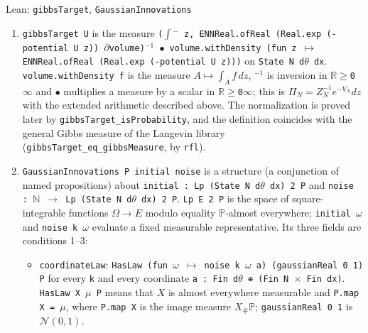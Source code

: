 \documentclass[11pt,a4paper]{report}
\begin{document}
\begin{leanbox}{Lean: \texttt{gibbsTarget}, \texttt{GaussianInnovations}}
\begin{enumerate}
\item \texttt{gibbs\allowbreak{}Target U} is the measure \texttt{(\ensuremath{\int}\ensuremath{{}^{-}} z, ENNReal.\allowbreak{}of\allowbreak{}Real (Real.\allowbreak{}exp (-\allowbreak{}potential U z)) \ensuremath{\partial}volume)\ensuremath{{}^{-1}} \ensuremath{\bullet} volume.\allowbreak{}with\allowbreak{}Density (fun z \ensuremath{\mapsto} ENNReal.\allowbreak{}of\allowbreak{}Real (Real.\allowbreak{}exp (-\allowbreak{}potential U z)))} on \texttt{State N d\ensuremath{\theta} dx}. \texttt{volume.\allowbreak{}with\allowbreak{}Density f} is the measure \(A\mapsto\int_Af\,dz\), \texttt{\ensuremath{{}^{-1}}} is inversion in \texttt{\ensuremath{\mathbb R}\ensuremath{\ge}0\ensuremath{\infty}} and \texttt{\ensuremath{\bullet}} multiplies a measure by a scalar in \texttt{\ensuremath{\mathbb R}\ensuremath{\ge}0\ensuremath{\infty}}; this is \(\Pi_N=Z_N^{-1}e^{-V_N}dz\) with the extended arithmetic described above. The normalization is proved later by \texttt{gibbs\allowbreak{}Target\_\allowbreak{}is\allowbreak{}Probability}, and the definition coincides with the general Gibbs measure of the Langevin library (\texttt{gibbs\allowbreak{}Target\_\allowbreak{}eq\_\allowbreak{}gibbs\allowbreak{}Measure}, by \texttt{rfl}).

\item \texttt{Gaussian\allowbreak{}Innovations P initial noise} is a structure (a conjunction of named propositions) about \texttt{initial : Lp (State N d\ensuremath{\theta} dx) 2 P} and \texttt{noise : \ensuremath{\mathbb N} \ensuremath{\to} Lp (State N d\ensuremath{\theta} dx) 2 P}. \texttt{Lp E 2 P} is the space of square-integrable functions \(\Omega\to E\) modulo equality \(\mathbb P\)-almost everywhere; \texttt{initial \ensuremath{\omega}} and \texttt{noise k \ensuremath{\omega}} evaluate a fixed measurable representative. Its three fields are conditions 1–3:

\begin{itemize}


\item \texttt{coordinate\allowbreak{}Law}: \texttt{Has\allowbreak{}Law (fun \ensuremath{\omega} \ensuremath{\mapsto} noise k \ensuremath{\omega} a) (gaussian\allowbreak{}Real 0 1) P} for every \texttt{k} and every coordinate \texttt{a : Fin d\ensuremath{\theta} ⊕ (Fin N \ensuremath{\times} Fin dx)}. \texttt{Has\allowbreak{}Law X \ensuremath{\mu} P} means that \(X\) is almost everywhere measurable and \texttt{P.\allowbreak{}map X = \ensuremath{\mu}}, where \texttt{P.\allowbreak{}map X} is the image measure \(X_\#\mathbb P\); \texttt{gaussian\allowbreak{}Real 0 1} is \(\mathcal N(0,1)\).


\end{itemize}
\end{enumerate}
\end{leanbox}
\end{document}
